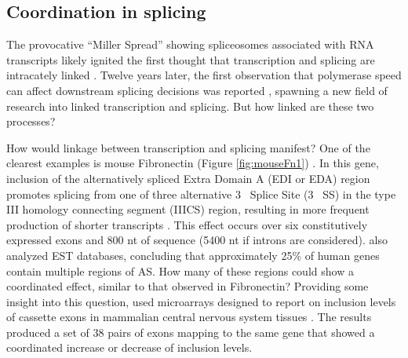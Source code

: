   \subsection{Coordination in splicing}\label{sec: Coordination in splicing}

    The provocative ``Miller Spread'' showing spliceosomes associated with RNA transcripts likely ignited the first thought that transcription and splicing are intracately linked \citep{Osheim1985}. Twelve years later, the first observation that polymerase speed can affect downstream splicing decisions was reported \citep{Cramer1997}, spawning a new field of research into linked transcription and splicing. But how linked are these two processes? 

    How would linkage between transcription and splicing manifest? One of the clearest examples is mouse Fibronectin \fn{} (Figure \ref{fig:mouseFn1}) \citep{Schwarzbauer1983, White2011a}. In this gene, inclusion of the alternatively spliced Extra Domain A (EDI or EDA) region promotes splicing from one of three alternative 3\textprime~ Splice Site (3\textprime~ SS) in the type III homology connecting segment (IIICS) region, resulting in more frequent production of shorter transcripts \citep{Fededa2005}. This effect occurs over six constitutively expressed exons and 800 nt of sequence (5400 nt if introns are considered). \citep{Fededa2005} also analyzed EST databases, concluding that approximately 25\% of human genes contain multiple regions of AS. How many of these regions could show a coordinated effect, similar to that observed in Fibronectin? Providing some insight into this question, \citep{Fagnani2007} used microarrays designed to report on inclusion levels of cassette exons in mammalian central nervous system tissues \citep{Fagnani2007}. The results produced a set of 38 pairs of exons mapping to the same gene that showed a coordinated increase or decrease of inclusion levels. 

